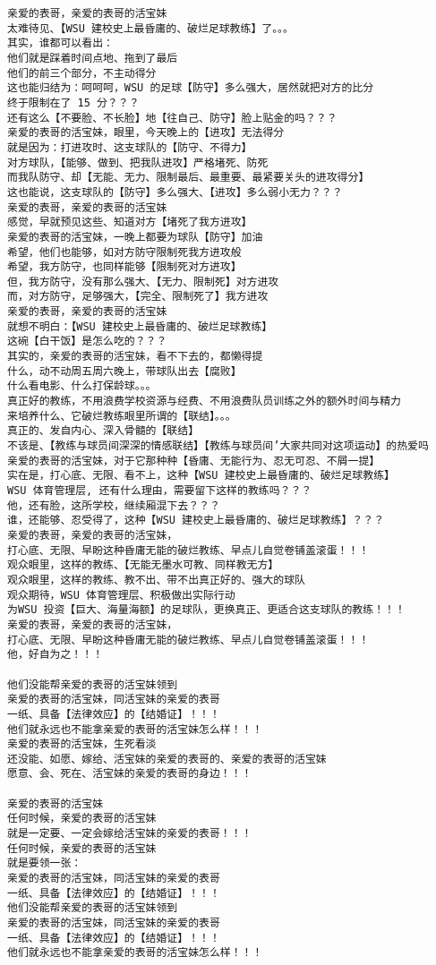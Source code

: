 \documentclass[9pt, b5paper]{article}
\begin{document}
\begin{verbatim}
亲爱的表哥，亲爱的表哥的活宝妹
太难待见、【WSU 建校史上最昏庸的、破烂足球教练】了。。。
其实，谁都可以看出：
他们就是踩着时间点地、拖到了最后
他们的前三个部分，不主动得分
这也能归结为：呵呵呵，WSU 的足球【防守】多么强大，居然就把对方的比分
终于限制在了 15 分？？？
还有这么【不要脸、不长脸】地【往自己、防守】脸上贴金的吗？？？
亲爱的表哥的活宝妹，眼里，今天晚上的【进攻】无法得分
就是因为：打进攻时、这支球队的【防守、不得力】
对方球队，【能够、做到、把我队进攻】严格堵死、防死
而我队防守、却【无能、无力、限制最后、最重要、最紧要关头的进攻得分】
这也能说，这支球队的【防守】多么强大、【进攻】多么弱小无力？？？
亲爱的表哥，亲爱的表哥的活宝妹
感觉，早就预见这些、知道对方【堵死了我方进攻】
亲爱的表哥的活宝妹，一晚上都要为球队【防守】加油
希望，他们也能够，如对方防守限制死我方进攻般
希望，我方防守，也同样能够【限制死对方进攻】
但，我方防守，没有那么强大、【无力、限制死】对方进攻
而，对方防守，足够强大，【完全、限制死了】我方进攻
亲爱的表哥，亲爱的表哥的活宝妹
就想不明白：【WSU 建校史上最昏庸的、破烂足球教练】
这碗【白干饭】是怎么吃的？？？
其实的，亲爱的表哥的活宝妹，看不下去的，都懒得提
什么，动不动周五周六晚上，带球队出去【腐败】
什么看电影、什么打保龄球。。。
真正好的教练，不用浪费学校资源与经费、不用浪费队员训练之外的额外时间与精力
来培养什么、它破烂教练眼里所谓的【联结】。。。
真正的、发自内心、深入骨髓的【联结】
不该是、【教练与球员间深深的情感联结】【教练与球员间’大家共同对这项运动】的热爱吗
亲爱的表哥的活宝妹，对于它那种种【昏庸、无能行为、忍无可忍、不屑一提】
实在是，打心底、无限、看不上，这种【WSU 建校史上最昏庸的、破烂足球教练】
WSU 体育管理层, 还有什么理由，需要留下这样的教练吗？？？
他，还有脸，这所学校，继续厢混下去？？？
谁，还能够、忍受得了，这种【WSU 建校史上最昏庸的、破烂足球教练】？？？
亲爱的表哥，亲爱的表哥的活宝妹，
打心底、无限、早盼这种昏庸无能的破烂教练、早点儿自觉卷铺盖滚蛋！！！
观众眼里，这样的教练、【无能无墨水可教、同样教无方】
观众眼里，这样的教练、教不出、带不出真正好的、强大的球队
观众期待，WSU 体育管理层、积极做出实际行动
为WSU 投资【巨大、海量海额】的足球队，更换真正、更适合这支球队的教练！！！
亲爱的表哥，亲爱的表哥的活宝妹，
打心底、无限、早盼这种昏庸无能的破烂教练、早点儿自觉卷铺盖滚蛋！！！
他，好自为之！！！

他们没能帮亲爱的表哥的活宝妹领到
亲爱的表哥的活宝妹，同活宝妹的亲爱的表哥
一纸、具备【法律效应】的【结婚证】！！！
他们就永远也不能拿亲爱的表哥的活宝妹怎么样！！！
亲爱的表哥的活宝妹，生死看淡
还没能、如愿、嫁给、活宝妹的亲爱的表哥的、亲爱的表哥的活宝妹
愿意、会、死在、活宝妹的亲爱的表哥的身边！！！

亲爱的表哥的活宝妹
任何时候，亲爱的表哥的活宝妹
就是一定要、一定会嫁给活宝妹的亲爱的表哥！！！
任何时候，亲爱的表哥的活宝妹
就是要领一张：
亲爱的表哥的活宝妹，同活宝妹的亲爱的表哥
一纸、具备【法律效应】的【结婚证】！！！
他们没能帮亲爱的表哥的活宝妹领到
亲爱的表哥的活宝妹，同活宝妹的亲爱的表哥
一纸、具备【法律效应】的【结婚证】！！！
他们就永远也不能拿亲爱的表哥的活宝妹怎么样！！！


\end{verbatim}
\end{document}
